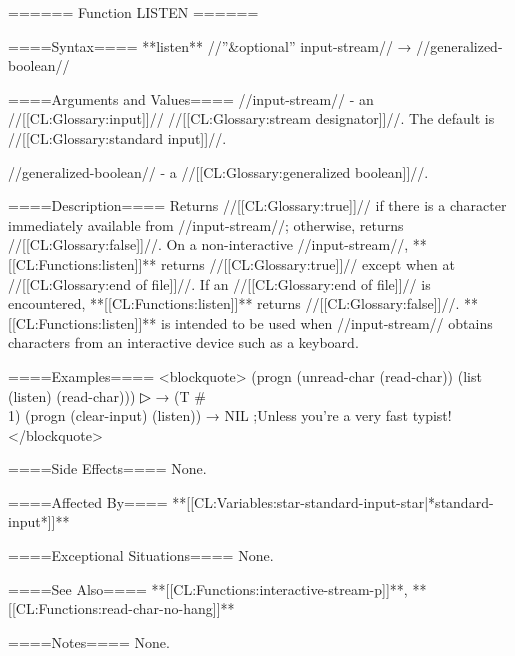 ====== Function LISTEN ======

====Syntax====
**{listen}** //''&optional'' input-stream// → //generalized-boolean//

====Arguments and Values====
//input-stream// - an //[[CL:Glossary:input]]// //[[CL:Glossary:stream designator]]//. The default is //[[CL:Glossary:standard input]]//.

//generalized-boolean// - a //[[CL:Glossary:generalized boolean]]//.

====Description====
Returns //[[CL:Glossary:true]]// if there is a character immediately available from //input-stream//; otherwise, returns //[[CL:Glossary:false]]//. On a non-interactive //input-stream//, **[[CL:Functions:listen]]** returns //[[CL:Glossary:true]]// except when at //[[CL:Glossary:end of file]]//. If an //[[CL:Glossary:end of file]]// is encountered, **[[CL:Functions:listen]]** returns //[[CL:Glossary:false]]//. **[[CL:Functions:listen]]** is intended to be used when //input-stream// obtains characters from an interactive device such as a keyboard.

====Examples====
<blockquote> (progn (unread-char (read-char)) (list (listen) (read-char)))
▷  → (T #\\1) (progn (clear-input) (listen)) → NIL ;Unless you're a very fast typist! </blockquote>

====Side Effects====
None.

====Affected By====
**[[CL:Variables:star-standard-input-star|*standard-input*]]**

====Exceptional Situations====
None.

====See Also====
**[[CL:Functions:interactive-stream-p]]**, **[[CL:Functions:read-char-no-hang]]**

====Notes====
None.

